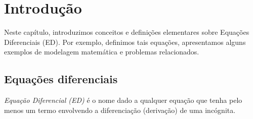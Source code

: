 

\chapter{Introdução}\label{cap_intro}

Neste capítulo, introduzimos conceitos e definições elementares sobre Equações Diferenciais (ED). Por exemplo, definimos tais equações, apresentamos alguns exemplos de modelagem matemática e problemas relacionados.

\section{Equações diferenciais}\label{cap_intro_sec_ed}


\emph{Equação Diferencial (ED)} é o nome dado a qualquer equação que tenha pelo menos um termo envolvendo a diferenciação (derivação) de uma incógnita.

